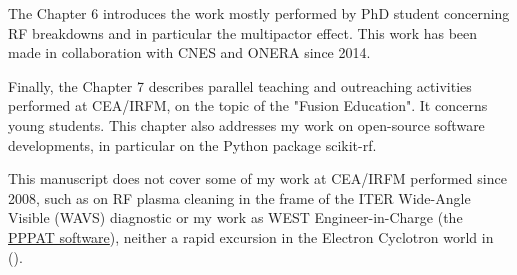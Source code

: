The Chapter 6 introduces the work mostly performed by PhD student concerning RF breakdowns and in particular the multipactor effect. This work has been made in collaboration with CNES and ONERA since 2014.

Finally, the Chapter 7 describes parallel teaching and outreaching activities performed at CEA/IRFM, on the topic of the "Fusion Education". It concerns young students. This chapter also addresses my work on open-source software developments, in particular on the Python package scikit-rf. 

This manuscript does not cover some of my work at CEA/IRFM performed since 2008, such as on RF plasma cleaning in the frame of the ITER Wide-Angle Visible (WAVS) diagnostic or my work as WEST Engineer-in-Charge (the \href{https://github.com/IRFM/PPPAT/}{PPPAT software}), neither a rapid excursion in the Electron Cyclotron world in ().
